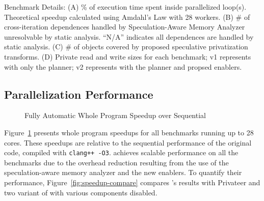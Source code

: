 \begin{table}[h]
  \centering
  
  \caption{
    Benchmark Details:
    (A) \% of
    execution time spent inside parallelized loop(s). Theoretical speedup
    calculated using Amdahl's Law with 28 workers.
    (B) \# of cross-iteration dependences
    handled by Speculation-Aware Memory Analyzer unresolvable by
    static analysis. ``N/A'' indicates all dependences are handled by static analysis.
    (C) \# of objects covered by proposed speculative
    privatization transforms.
    (D) Private read and write sizes for each benchmark; v1 represents
    \name with only the planner; v2 represents \name with
    the planner and propsed enablers.}
  \label{tab:benchmark-list}
    \vspace{-5pt}
\end{table}

\subsection{Parallelization Performance}

\begin{figure}[ht]
  \centering
  \caption{Fully Automatic Whole Program Speedup over Sequential}
  \label{fig:multi-core-scale}
\end{figure}

Figure~\ref{fig:multi-core-scale} presents whole program speedups for
all benchmarks running up to 28 cores. These speedups are
relative to the sequential performance of the original code, compiled
with \texttt{clang++ -O3}. \name achieves scalable performance on all the
benchmarks due to the overhead reduction resulting from the use
of the speculation-aware memory analyzer and the new enablers.
To quantify their performance, Figure~\ref{fig:speedup-compare} compares
\namensp's results with Privateer and two variant of \name with various
components disabled.

